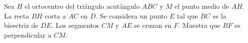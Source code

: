 Sea $H$ el ortocentro del triángulo acutángulo $ABC$ y $M$ el punto medio de $AH$. La recta $BH$ corta a $AC$ en $D$. Se considera un punto $E$ tal que $BC$ es la bisectriz de $DE$. Los segmentos $CM$ y $AE$ se cruzan en $F$. Muestra que $BF$ es perpendicular a $CM$.